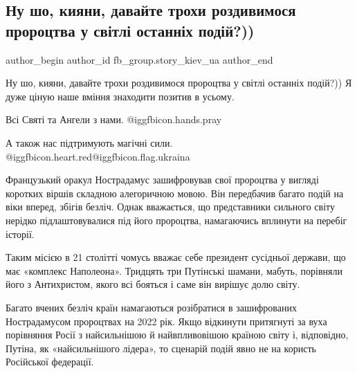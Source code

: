  
 
 
 
 
 
\subsection{Ну шо, кияни, давайте трохи роздивимося пророцтва у світлі останніх подій?))}
\label{sec:08_03_2022.fb.fb_group.story_kiev_ua.1.proroctva_kiane}
 
\ifcmt
 author_begin
   author_id fb_group.story_kiev_ua
 author_end
\fi

Ну шо, кияни, давайте трохи роздивимося пророцтва у світлі останніх подій?)) Я
дуже ціную наше вміння знаходити позитив в усьому. 

Всі Святі та Ангели з нами.  @igg{fbicon.hands.pray} 

А також нас підтримують магічні сили. @igg{fbicon.heart.red}@igg{fbicon.flag.ukraina}

Французький оракул Нострадамус зашифровував свої пророцтва у вигляді коротких
віршів складною алегоричною мовою. Він передбачив багато подій на віки вперед,
збігів безліч. Однак вважається, що представники сильного світу нерідко
підлаштовувалися під його пророцтва, намагаючись вплинути на перебіг історії.


Таким місією в 21 столітті чомусь вважає себе президент сусідньої держави, що
має «комплекс Наполеона». Тридцять три Путінські шамани, мабуть, порівняли його
з Антихристом, якого всі бояться і саме він вирішує долю світу.

Багато вчених безліч країн намагаються розібратися в зашифрованих Нострадамусом
пророцтвах на 2022 рік. Якщо відкинути притягнуті за вуха порівняння Росії з
найсильнішою й найвпливовішою країною світу і, відповідно, Путіна, як
«найсильнішого лідера», то сценарій подій явно не на користь Російської
федерації.

